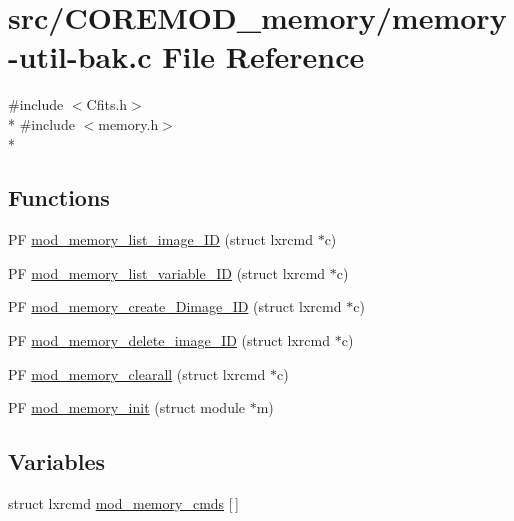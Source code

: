 \hypertarget{src_2COREMOD__memory_2memory-util-bak_8c}{\section{src/\+C\+O\+R\+E\+M\+O\+D\+\_\+memory/memory-\/util-\/bak.c File Reference}
\label{src_2COREMOD__memory_2memory-util-bak_8c}
}
{\ttfamily \#include $<$Cfits.\+h$>$}\\*
{\ttfamily \#include $<$memory.\+h$>$}\\*
\subsection*{Functions}
\begin{DoxyCompactItemize}
\item 
P\+F \hyperlink{src_2COREMOD__memory_2memory-util-bak_8c_a726a603084661cdde9804771ed4effbd}{mod\+\_\+memory\+\_\+list\+\_\+image\+\_\+\+I\+D} (struct lxrcmd $\ast$c)
\item 
P\+F \hyperlink{src_2COREMOD__memory_2memory-util-bak_8c_a2c9d01f20eaa6f60dad3250105d7a5ee}{mod\+\_\+memory\+\_\+list\+\_\+variable\+\_\+\+I\+D} (struct lxrcmd $\ast$c)
\item 
P\+F \hyperlink{src_2COREMOD__memory_2memory-util-bak_8c_a568ab756155971ba66789611996a13e4}{mod\+\_\+memory\+\_\+create\+\_\+Dimage\+\_\+\+I\+D} (struct lxrcmd $\ast$c)
\item 
P\+F \hyperlink{src_2COREMOD__memory_2memory-util-bak_8c_abc825a2ddf37777ae6925b242fdaac8f}{mod\+\_\+memory\+\_\+delete\+\_\+image\+\_\+\+I\+D} (struct lxrcmd $\ast$c)
\item 
P\+F \hyperlink{src_2COREMOD__memory_2memory-util-bak_8c_a6ca5475168daaf1a7e36283ccbec5856}{mod\+\_\+memory\+\_\+clearall} (struct lxrcmd $\ast$c)
\item 
P\+F \hyperlink{src_2COREMOD__memory_2memory-util-bak_8c_a40ae03fec034d9ae5dd46beeb878dc65}{mod\+\_\+memory\+\_\+init} (struct module $\ast$m)
\end{DoxyCompactItemize}
\subsection*{Variables}
\begin{DoxyCompactItemize}
\item 
struct lxrcmd \hyperlink{src_2COREMOD__memory_2memory-util-bak_8c_a2cf116839ba2fdb2d9fed443b032d1ca}{mod\+\_\+memory\+\_\+cmds} \mbox{[}$\,$\mbox{]}
\end{DoxyCompactItemize}



